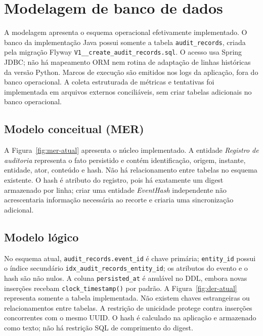 \section{Modelagem de banco de dados}
\label{sec:banco}
A modelagem apresenta o esquema operacional efetivamente implementado. O banco da implementação Java possui somente a tabela \texttt{audit\_records}, criada pela migração Flyway \texttt{V1\_\_create\_audit\_records.sql}. O acesso usa Spring JDBC; não há mapeamento ORM nem rotina de adaptação de linhas históricas da versão Python. Marcos de execução são emitidos nos logs da aplicação, fora do banco operacional. A coleta estruturada de métricas e tentativas foi implementada em arquivos externos conciliáveis, sem criar tabelas adicionais no banco operacional.

\subsection{Modelo conceitual (MER)}
A Figura~\ref{fig:mer-atual} apresenta o núcleo implementado. A entidade \textit{Registro de auditoria} representa o fato persistido e contém identificação, origem, instante, entidade, ator, conteúdo e hash. Não há relacionamento entre tabelas no esquema existente. O hash é atributo do registro, pois há exatamente um digest armazenado por linha; criar uma entidade \textit{EventHash} independente não acrescentaria informação necessária ao recorte e criaria uma sincronização adicional.


\subsection{Modelo lógico}
No esquema atual, \texttt{audit\_records.event\_id} é chave primária; \texttt{entity\_id} possui o índice secundário \texttt{idx\_audit\_records\_entity\_id}; os atributos do evento e o hash são não nulos. A coluna \texttt{persisted\_at} é anulável no DDL, embora novas inserções recebam \texttt{clock\_timestamp()} por padrão. A Figura~\ref{fig:der-atual} representa somente a tabela implementada. Não existem chaves estrangeiras ou relacionamentos entre tabelas. A restrição de unicidade protege contra inserções concorrentes com o mesmo UUID. O hash é calculado na aplicação e armazenado como texto; não há restrição SQL de comprimento do digest.


